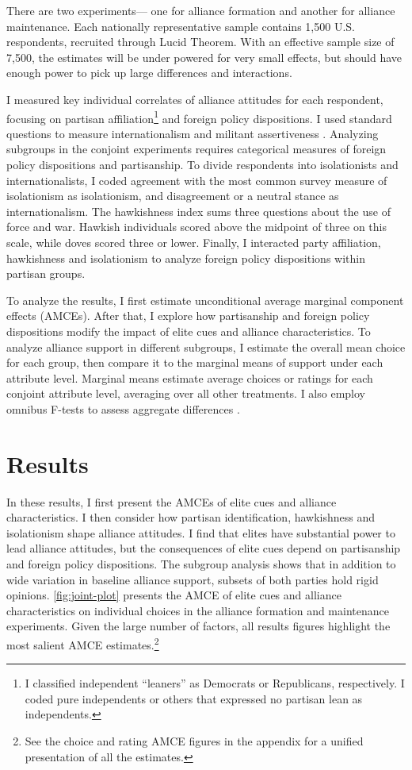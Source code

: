 \documentclass[12pt]{article}
\begin{document}
There are two experiments--- one for alliance formation and another for alliance maintenance. 
Each nationally representative sample contains 1,500 U.S. respondents, recruited through Lucid Theorem.
With an effective sample size of 7,500, the estimates will be under powered for very small effects, but should have enough power to pick up large differences and interactions. 


I measured key individual correlates of alliance attitudes for each respondent, focusing on partisan affiliation\footnote{I classified independent ``leaners'' as Democrats or Republicans, respectively. I coded pure independents or others that expressed no partisan lean as independents.} and foreign policy dispositions. 
I used standard questions to measure internationalism and militant assertiveness \citep{KertzerBrutger2016}.
Analyzing subgroups in the conjoint experiments requires categorical measures of foreign policy dispositions and partisanship. 
To divide respondents into isolationists and internationalists, I coded agreement with the most common survey measure of isolationism as isolationism, and disagreement or a neutral stance as internationalism. 
The hawkishness index sums three questions about the use of force and war. 
Hawkish individuals scored above the midpoint of three on this scale, while doves scored three or lower. 
Finally, I interacted party affiliation, hawkishness and isolationism to analyze foreign policy dispositions within partisan groups.


To analyze the results, I first estimate unconditional average marginal component effects (AMCEs).
After that, I explore how partisanship and foreign policy dispositions modify the impact of elite cues and alliance characteristics. 
To analyze alliance support in different subgroups, I estimate the overall mean choice for each group, then compare it to the marginal means of support under each attribute level.
Marginal means estimate average choices or ratings for each conjoint attribute level, averaging over all other treatments. 
I also employ omnibus F-tests to assess aggregate differences \citep{Leeperetal2020}. 


\section{Results} 


In these results, I first present the AMCEs of elite cues and alliance characteristics.
I then consider how partisan identification, hawkishness and isolationism shape alliance attitudes. 
I find that elites have substantial power to lead alliance attitudes, but the consequences of elite cues depend on partisanship and foreign policy dispositions.
The subgroup analysis shows that in addition to wide variation in baseline alliance support, subsets of both parties hold rigid opinions. 
\autoref{fig:joint-plot} presents the AMCE of elite cues and alliance characteristics on individual choices in the alliance formation and maintenance experiments.
Given the large number of factors, all results figures highlight the most salient AMCE estimates.\footnote{See the choice and rating AMCE figures in the appendix for a unified presentation of all the estimates.}
\end{document}
